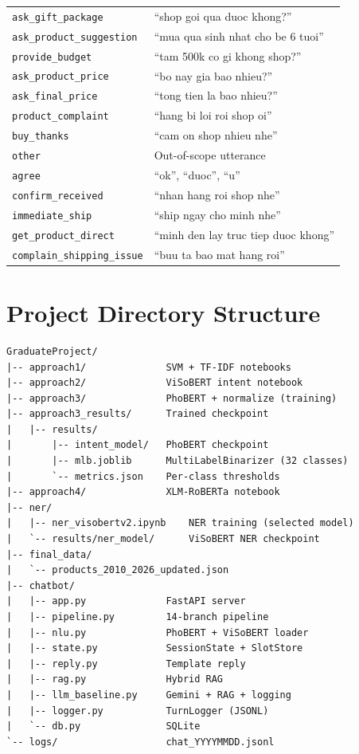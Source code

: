 \documentclass[12pt, a4paper]{report}
\begin{document}
\begin{longtable}{lX}
\texttt{ask\_gift\_package}          & ``shop goi qua duoc khong?'' \\
\texttt{ask\_product\_suggestion}    & ``mua qua sinh nhat cho be 6 tuoi'' \\
\texttt{provide\_budget}             & ``tam 500k co gi khong shop?'' \\
\texttt{ask\_product\_price}         & ``bo nay gia bao nhieu?'' \\
\texttt{ask\_final\_price}           & ``tong tien la bao nhieu?'' \\
\texttt{product\_complaint}          & ``hang bi loi roi shop oi'' \\
\texttt{buy\_thanks}                 & ``cam on shop nhieu nhe'' \\
\texttt{other}                       & Out-of-scope utterance \\
\texttt{agree}                       & ``ok'', ``duoc'', ``u'' \\
\texttt{confirm\_received}           & ``nhan hang roi shop nhe'' \\
\texttt{immediate\_ship}             & ``ship ngay cho minh nhe'' \\
\texttt{get\_product\_direct}        & ``minh den lay truc tiep duoc khong'' \\
\texttt{complain\_shipping\_issue}   & ``buu ta bao mat hang roi'' \\
\end{longtable}

\chapter{Project Directory Structure}
\label{app:structure}

\begin{lstlisting}
GraduateProject/
|-- approach1/              SVM + TF-IDF notebooks
|-- approach2/              ViSoBERT intent notebook
|-- approach3/              PhoBERT + normalize (training)
|-- approach3_results/      Trained checkpoint
|   |-- results/
|       |-- intent_model/   PhoBERT checkpoint
|       |-- mlb.joblib      MultiLabelBinarizer (32 classes)
|       `-- metrics.json    Per-class thresholds
|-- approach4/              XLM-RoBERTa notebook
|-- ner/
|   |-- ner_visobertv2.ipynb    NER training (selected model)
|   `-- results/ner_model/      ViSoBERT NER checkpoint
|-- final_data/
|   `-- products_2010_2026_updated.json
|-- chatbot/
|   |-- app.py              FastAPI server
|   |-- pipeline.py         14-branch pipeline
|   |-- nlu.py              PhoBERT + ViSoBERT loader
|   |-- state.py            SessionState + SlotStore
|   |-- reply.py            Template reply
|   |-- rag.py              Hybrid RAG
|   |-- llm_baseline.py     Gemini + RAG + logging
|   |-- logger.py           TurnLogger (JSONL)
|   `-- db.py               SQLite
`-- logs/                   chat_YYYYMMDD.jsonl
\end{lstlisting}
\end{document}
